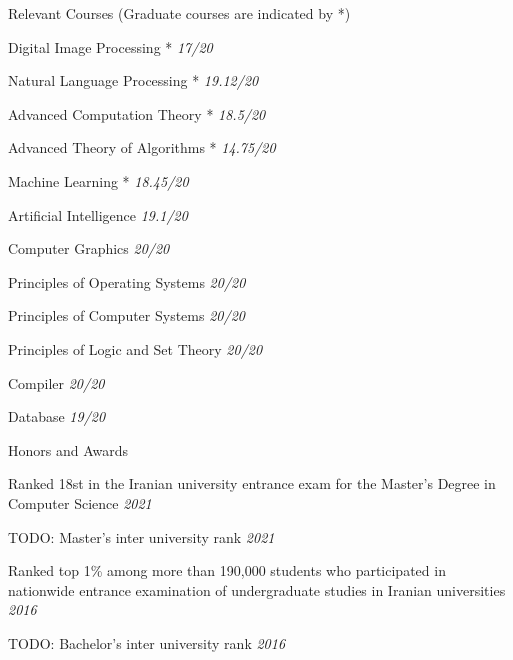 \documentclass[]{main}
\begin{document}
\begin{section}{Relevant Courses \small{(Graduate courses are indicated by *)}}
 \begin{multicols}{2}
     \begin{subsectionbullet}
         \item Digital Image Processing * \hfill \textit{17/20}
         \item Natural Language Processing * \hfill \textit{19.12/20}
         \item Advanced Computation Theory * \hfill \textit{18.5/20}
         \item Advanced Theory of Algorithms * \hfill \textit{14.75/20}
         \item Machine Learning * \hfill \textit{18.45/20}
         \item Artificial Intelligence \hfill \textit{19.1/20}
         \item Computer Graphics \hfill \textit{20/20}
         \item Principles of Operating Systems \hfill \textit{20/20}
         \item Principles of Computer Systems \hfill \textit{20/20}
         \item Principles of Logic and Set Theory \hfill \textit{20/20}
         \item Compiler \hfill \textit{20/20}
         \item Database \hfill \textit{19/20}
     \end{subsectionbullet}
 \end{multicols}
\end{section}

\begin{section}{Honors and Awards}
 \begin{subsectionbullet}
     \item Ranked 18st in the Iranian university entrance exam for the Master's Degree in Computer Science \hfill \textit{2021}
     \item TODO: Master's inter university rank \hfill \textit{2021}
     \item Ranked top 1\% among more than 190,000 students who participated in nationwide entrance examination of undergraduate studies in Iranian universities \hfill \textit{2016}
     \item TODO: Bachelor's inter university rank \hfill \textit{2016}
 \end{subsectionbullet}
\end{section}
\end{document}
